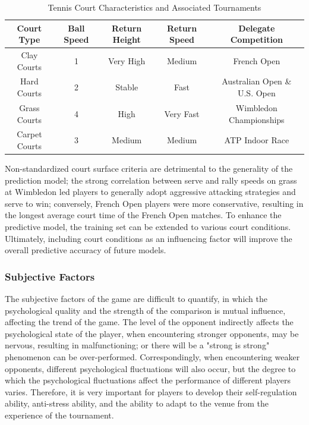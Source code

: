 \begin{table}[htbp]
    \centering
    \caption{Tennis Court Characteristics and Associated Tournaments} 
    \vspace{8pt}
    \label{tab:tennis_courts}
    \begin{tabular}{c|cccc}
        \toprule[1.5pt]
        Court Type & Ball Speed & Return Height & Return Speed & Delegate Competition\\
        \midrule[1pt]
        Clay Courts & 1 & Very High & Medium & French Open \\
        Hard Courts & 2 & Stable & Fast & Australian Open \& U.S. Open \\
        Grass Courts & 4 & High & Very Fast & Wimbledon Championships \\
        Carpet Courts & 3 & Medium & Medium & ATP Indoor Race \\
        \bottomrule[1.5pt]
    \end{tabular}
\end{table}


Non-standardized court surface criteria are detrimental to the generality of the prediction model; the strong correlation between serve and rally speeds on grass at Wimbledon led players to generally adopt aggressive attacking strategies and serve to win; conversely, French Open players were more conservative, resulting in the longest average court time of the French Open matches. To enhance the predictive model, the training set can be extended to various court conditions. Ultimately, including court conditions as an influencing factor will improve the overall predictive accuracy of future models.

\subsubsection{Subjective Factors}
The subjective factors of the game are difficult to quantify, in which the psychological quality and the strength of the comparison is mutual influence, affecting the trend of the game. The level of the opponent indirectly affects the psychological state of the player, when encountering stronger opponents, may be nervous, resulting in malfunctioning; or there will be a "strong is strong" phenomenon can be over-performed. Correspondingly, when encountering weaker opponents, different psychological fluctuations will also occur, but the degree to which the psychological fluctuations affect the performance of different players varies. Therefore, it is very important for players to develop their self-regulation ability, anti-stress ability, and the ability to adapt to the venue from the experience of the tournament.

